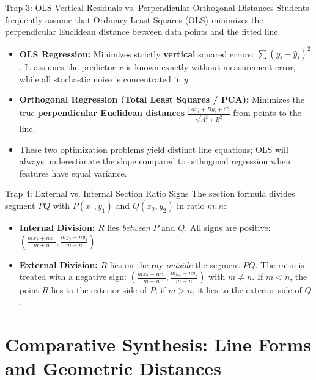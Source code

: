 \begin{trapbox}{Trap 3: OLS Vertical Residuals vs. Perpendicular Orthogonal Distances}
Students frequently assume that Ordinary Least Squares (OLS) minimizes the perpendicular Euclidean distance between data points and the fitted line.
\begin{itemize}
    \item \textbf{OLS Regression:} Minimizes strictly \textbf{vertical} squared errors: $\sum (y_i - \hat{y}_i)^2$. It assumes the predictor $x$ is known exactly without measurement error, while all stochastic noise is concentrated in $y$.
    \item \textbf{Orthogonal Regression (Total Least Squares / PCA):} Minimizes the true \textbf{perpendicular Euclidean distances} $\frac{|Ax_i + By_i + C|}{\sqrt{A^2 + B^2}}$ from points to the line.
    \item These two optimization problems yield distinct line equations; OLS will always underestimate the slope compared to orthogonal regression when features have equal variance.
\end{itemize}
\end{trapbox}

\begin{trapbox}{Trap 4: External vs. Internal Section Ratio Signs}
The section formula divides segment $PQ$ with $P(x_1, y_1)$ and $Q(x_2, y_2)$ in ratio $m : n$:
\begin{itemize}
    \item \textbf{Internal Division:} $R$ lies \textit{between} $P$ and $Q$. All signs are positive: $\left(\frac{mx_2 + nx_1}{m + n}, \frac{my_2 + ny_1}{m + n}\right)$.
    \item \textbf{External Division:} $R$ lies on the ray \textit{outside} the segment $PQ$. The ratio is treated with a negative sign: $\left(\frac{mx_2 - nx_1}{m - n}, \frac{my_2 - ny_1}{m - n}\right)$ with $m \neq n$. If $m < n$, the point $R$ lies to the exterior side of $P$; if $m > n$, it lies to the exterior side of $Q$.
\end{itemize}
\end{trapbox}

\section{Comparative Synthesis: Line Forms and Geometric Distances}

